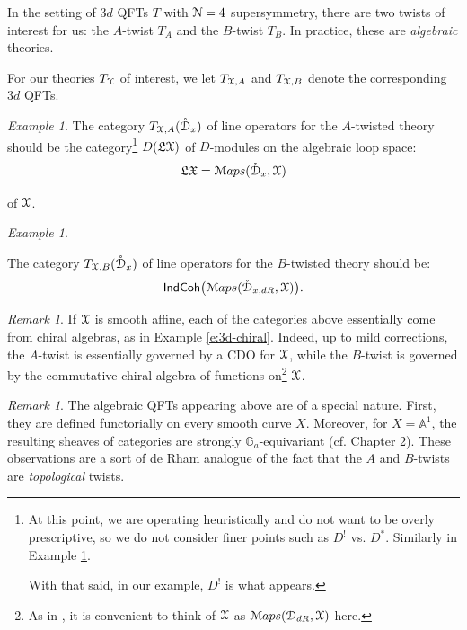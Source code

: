 \documentclass[reqno,11pt]{amsart}
\numberwithin{equation}{subsection}
\theoremstyle{remark}
\newtheorem{rem}[thm]{Remark}
\newtheorem{example}[thm]{Example}
\newcommand{\bA}{{\mathbb A}}
\newcommand{\bG}{{\mathbb G}}
\newcommand{\sD}{{\EuScript D}}
\newcommand{\sM}{{\EuScript M}}
\newcommand{\sN}{{\EuScript N}}
\newcommand{\sX}{{\EuScript X}}
\newcommand{\fL}{{\mathfrak L}}
\newcommand{\fX}{{\mathfrak X}}
\newcommand{\IndCoh}{\mathsf{IndCoh}}
\newcommand{\Maps}{\sM aps}
\renewcommand{\o}[1]{\mathring{#1}}
\begin{document}
In the setting of $3d$ QFTs $T$ with $\sN = 4$ supersymmetry, 
there are two twists of interest for us: the $A$-twist $T_A$ and
the $B$-twist $T_B$. In practice, these are \emph{algebraic} theories.

For our theories $T_{\sX}$ of interest,
we let $T_{\sX,A}$ and $T_{\sX,B}$ denote the corresponding
$3d$ QFTs. 

\begin{example}

The category $T_{\sX,A}(\o{\sD}_x)$ of line operators for the $A$-twisted theory
should be the category\footnote{At this point,
we are operating heuristically and do not want to be overly prescriptive, so
we do not consider finer points such as $D^!$ vs. $D^*$. Similarly in 
Example \ref{e:b}.

With that said, in our example, $D^!$ is what appears.}
$D(\fL\sX)$ of $D$-modules on the algebraic loop space: 
%
\[
\fL \fX = \Maps(\o{\sD}_x,\sX)
\]

\noindent of $\sX$.

\end{example}

\begin{example}\label{e:b}

The category $T_{\sX,B}(\o{\sD}_x)$ of line operators for the $B$-twisted
theory should be:
%
\[
\IndCoh\big(\Maps(\o{\sD}_{x,dR},\sX)\big).
\]

\end{example}

\begin{rem}

If $\sX$ is smooth affine, each of the categories above essentially
come from chiral algebras, as in Example \ref{e:3d-chiral}.
Indeed, up to mild corrections, 
the $A$-twist is essentially governed by a CDO for $\sX$, while the
$B$-twist is governed by the commutative chiral algebra of functions 
on\footnote{As in \cite{chiral}, it is convenient to think of 
$\sX$ as $\Maps(\sD_{dR},\sX)$ here.} $\sX$.

\end{rem}

\begin{rem}

The algebraic QFTs appearing above are of a special nature. First, they
are defined functorially on every smooth curve $X$. Moreover, for 
$X = \bA^1$, the resulting sheaves of categories are strongly
$\bG_a$-equivariant (cf. \cite{butson-thesis-i} Chapter 2).
These observations are a sort of de Rham analogue of the
fact that the $A$ and $B$-twists are \emph{topological} twists. 

\end{rem}
\end{document}

